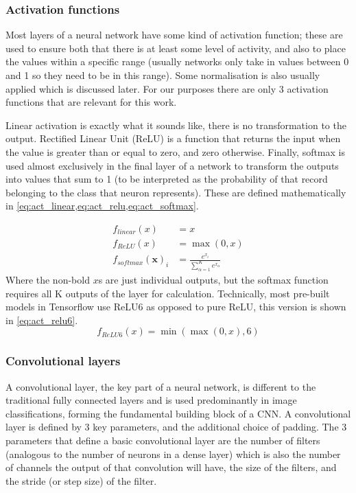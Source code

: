 \documentclass[12pt]{article}
\numberwithin{equation}{section}
\numberwithin{figure}{section}
\begin{document}
\subsubsection{Activation functions}
Most layers of a neural network have some kind of activation function; these are used to ensure both that there is at least some level of activity, and also to place the values within a specific range (usually networks only take in values between 0 and 1 so they need to be in this range). Some normalisation is also usually applied which is discussed later. For our purposes there are only 3 activation functions that are relevant for this work.

Linear activation is exactly what it sounds like, there is no transformation to the output. Rectified Linear Unit (ReLU) is a function that returns the input when the value is greater than or equal to zero, and zero otherwise. Finally, softmax is used almost exclusively in the final layer of a network to transform the outputs into values that sum to 1 (to be interpreted as the probability of that record belonging to the class that neuron represents). These are defined mathematically in \cref{eq:act_linear,eq:act_relu,eq:act_softmax}.

\begin{align}
	f_{linear}(x) &= x \label{eq:act_linear}\\
	f_{ReLU}(x)   &= \max(0, x) \label{eq:act_relu}\\
	f_{softmax}(\bm{x})_i &= \frac{e^{x_i}}{\sum_{\alpha=1}^{K}{e^{x_\alpha}}}\label{eq:act_softmax}
\end{align}
Where the non-bold $x$s are just individual outputs, but the softmax function requires all K outputs of the layer for calculation. Technically, most pre-built models in Tensorflow use ReLU6 as opposed to pure ReLU, this version is shown in \cref{eq:act_relu6}.
\begin{equation}
	f_{ReLU6}(x) = \min(\max(0, x), 6) \label{eq:act_relu6}
\end{equation}

\subsubsection{Convolutional layers}
A convolutional layer, the key part of a neural network, is different to the traditional fully connected layers and is used predominantly in image classifications, forming the fundamental building block of a CNN. A convolutional layer is defined by 3 key parameters, and the additional choice of padding. The 3 parameters that define a basic convolutional layer are the number of filters (analogous to the number of neurons in a dense layer) which is also the number of channels the output of that convolution will have, the size of the filters, and the stride (or step size) of the filter. 
\end{document}
